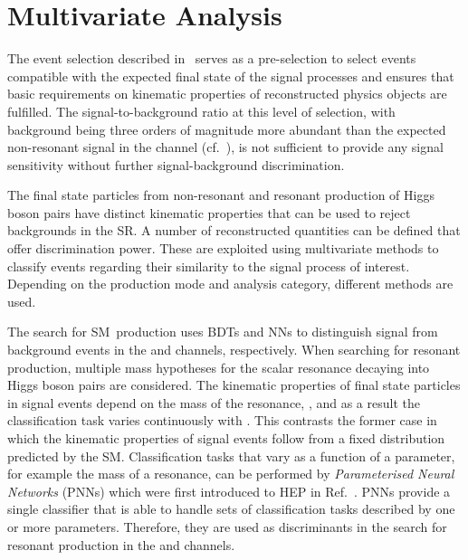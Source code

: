 \section{Multivariate Analysis}%
\label{sec:multivariate_analysis}

The event selection described in~ serves as a
pre-selection to select events compatible with the expected final state of the
signal processes and ensures that basic requirements on kinematic properties of
reconstructed physics objects are fulfilled.  The signal-to-background ratio at
this level of selection, with background being three orders of magnitude more
abundant than the expected non-resonant \HH signal in the \hadhad channel
(cf.~), is not sufficient to provide any signal
sensitivity without further signal-background discrimination.

The final state particles from non-resonant and resonant production of
Higgs boson pairs have distinct kinematic properties that can be used
to reject backgrounds in the SR.
A number of reconstructed quantities can be defined that offer
discrimination power. These are exploited using multivariate methods
to classify events regarding their similarity to the signal process of
interest.
Depending on the \HH production mode and analysis category, different
methods are used.


The search for SM~\HH production uses BDTs and NNs to distinguish signal from
background events in the \hadhad and \lephad channels, respectively. When
searching for resonant \HH production, multiple mass hypotheses for the scalar
resonance decaying into Higgs boson pairs are considered. The kinematic
properties of final state particles in signal events depend on the mass of the
resonance, \mX, and as a result the classification task varies continuously with
\mX. This contrasts the former case in which the kinematic properties of signal
events follow from a fixed distribution predicted by the SM. Classification
tasks that vary as a function of a parameter, for example the mass of a
resonance, can be performed by \emph{Parameterised Neural Networks} (PNNs) which
were first introduced to HEP in Ref.~\cite{Baldi:2016fzo}. PNNs provide a single
classifier that is able to handle sets of classification tasks described by one
or more parameters. Therefore, they are used as discriminants in the search for
resonant \HH production in the \hadhad and \lephad channels.

